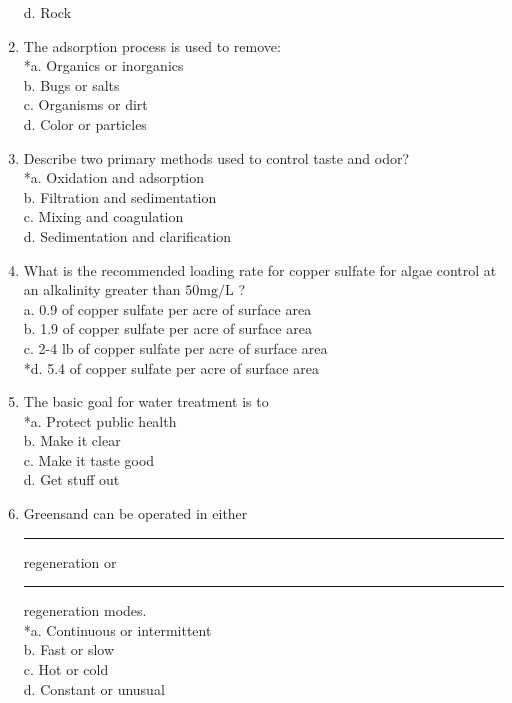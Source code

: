 \begin{enumerate}[1.]
d. Rock\\
\item The adsorption process is used to remove:\\
*a. Organics or inorganics\\
b. Bugs or salts\\
c. Organisms or dirt\\
d. Color or particles\\
\item Describe two primary methods used to control taste and odor?\\
*a. Oxidation and adsorption\\
b. Filtration and sedimentation\\
c. Mixing and coagulation\\
d. Sedimentation and clarification\\
\item What is the recommended loading rate for copper sulfate for algae control at an alkalinity greater than $50 \mathrm{mg} / \mathrm{L}$ ?\\
a. 0.9 of copper sulfate per acre of surface area\\
b. 1.9 of copper sulfate per acre of surface area\\
c. 2-4 lb of copper sulfate per acre of surface area\\
*d. 5.4 of copper sulfate per acre of surface area\\
\item The basic goal for water treatment is to\\
*a. Protect public health\\
b. Make it clear\\
c. Make it taste good\\
d. Get stuff out\\
\item Greensand can be operated in either \rule{1.5cm}{0.5pt} regeneration or \rule{1.5cm}{0.5pt} regeneration modes.\\
*a. Continuous or intermittent\\
b. Fast or slow\\
c. Hot or cold\\
d. Constant or unusual\\
\end{enumerate}
\newpage
